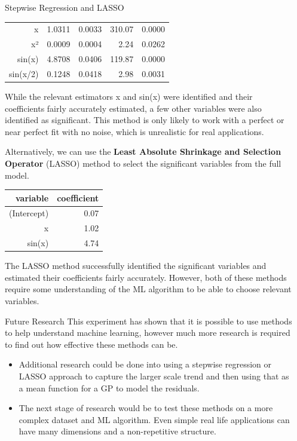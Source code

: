 \documentclass[final]{beamer}
\newlength{\sepwidth}
\newlength{\colwidth}
\newcommand{\separatorcolumn}{\begin{column}{\sepwidth}\end{column}}
\begin{document}
\begin{frame}[t]
\begin{columns}[t]
\begin{column}{\colwidth}
\begin{block}{Stepwise Regression and LASSO}
\begin{table}[ht]
\begin{tabular}{rrrrr}
						x           & 1.0311   & 0.0033     & 310.07  & 0.0000  \\
						x²          & 0.0009   & 0.0004     & 2.24    & 0.0262  \\
						sin(x)      & 4.8708   & 0.0406     & 119.87  & 0.0000  \\
						sin(x/2)    & 0.1248   & 0.0418     & 2.98    & 0.0031  \\
						\hline
					\end{tabular}
				\end{table}
While the relevant estimators x and sin(x) were identified and their coefficients fairly accurately estimated, a few other variables were also identified as significant.
This method is only likely to work with a perfect or near perfect fit with no noise, which is unrealistic for real applications.

				Alternatively, we can use the \textbf{Least Absolute Shrinkage and Selection Operator} (LASSO) method to select the significant variables from the full model.
				\begin{table}[ht]
					\centering
					\begin{tabular}{rr}
						\hline
						variable    & coefficient \\
						\hline
						(Intercept) & 0.07        \\
						x           & 1.02        \\
						sin(x)      & 4.74        \\
						\hline
					\end{tabular}
				\end{table}
				The LASSO method successfully identified the significant variables and estimated their coefficients fairly accurately.
				However, both of these methods require some understanding of the ML algorithm to be able to choose relevant variables. 
			\end{block}
			\begin{block}{Future Research}
This experiment has shown that it is possible to use methods to help understand machine learning, however much more research is required to find out how effective these methods can be. 
				\begin{itemize}
					\item Additional research could be done into using a stepwise regression or LASSO approach to capture the larger scale trend and then using that as a mean function for a GP to model the residuals.
					\item The next stage of research would be to test these methods on a more complex dataset and ML algorithm.
						  Even simple real life applications can have many dimensions and a non-repetitive structure.
				\end{itemize}
			\end{block}
		\end{column}
		\separatorcolumn
	\end{columns}
\end{frame}
\end{document}
